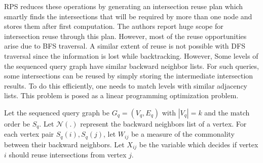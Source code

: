 RPS \cite{RPS-paper} reduces these operations by generating an intersection reuse plan which smartly finds the intersections that will be required by more than one node and stores them after first computation.
The authors report huge scope for intersection reuse through this plan.
However, most of the reuse opportunities arise due to BFS traversal.
A similar extent of reuse is not possible with DFS traversal since the information is lost while backtracking.
However, Some levels of the sequenced query graph have similar backward neighbor lists.
For such queries, some intersections can be reused by simply storing the intermediate intersection results.
To do this efficiently, one needs to match levels with similar adjacency lists.
This problem is posed as a linear programming optimization problem.

Let the sequenced query graph be $G_q=(V_q, E_q)$ with $|V_q|=k$ and the match order be $S_q$.
Let $\mathcal{N}(.)$ represent the backward neighbors list of a vertex.
For each vertex pair $S_q(i), S_q(j)$, let $W_{ij}$ be a measure of the commonality between their backward neighbors.
Let $X_{ij}$ be the variable which decides if vertex $i$ should reuse intersections from vertex $j$.

